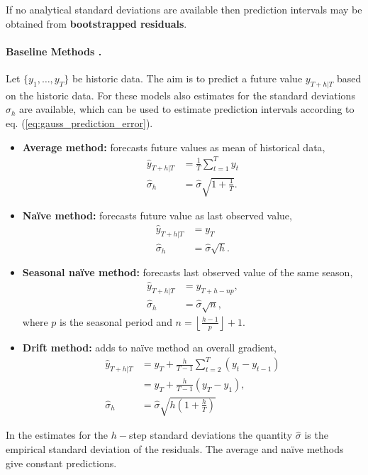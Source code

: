 \documentclass[12pt,a4paper]{article}
\begin{document}
If no analytical standard deviations are available then prediction intervals may be obtained from \textbf{bootstrapped residuals}.


\paragraph{Baseline Methods \cite{hyndman_forecasting_principles_2018}.}
Let $\{y_1, \dots, y_T\}$ be historic data. The aim is to predict a future value $y_{T+h | T}$ based on the historic data. For these models also estimates for the standard deviations $\hat\sigma_h$ are available, which can be used to estimate prediction intervals according to eq. (\ref{eq:gauss_prediction_error}).
\begin{itemize}
	\item \textbf{Average method:} forecasts future values as mean of historical data, 
	\begin{align}
	\hat y_{T+h | T} &= \frac{1}{T}\sum_{t=1} ^T y_t \\ 
	\hat \sigma_h &= \hat \sigma \sqrt{1+\frac{1}{T}}. 
	\end{align}
	\item \textbf{Na\"ive method:} forecasts future value as last observed value, 
	\begin{align}
	\hat y_{T+h | T} &= y_T \\
	\hat \sigma_h &= \hat \sigma \sqrt{h}. 
	\end{align}
	\item \textbf{Seasonal na\"ive method:} forecasts last observed value of the same season, 
	\begin{align}
	\hat y_{T+h | T} &=y_{T+h-np}, \\
	\hat \sigma_h &= \hat \sigma \sqrt{n}, 
	\end{align}
	where $p$ is the seasonal period and  $n = \left \lfloor{\frac{h-1}{p}}\right \rfloor + 1$. 
	\item \textbf{Drift method:} adds to na\"ive method an overall gradient,   
	\begin{align}
	\hat y_{T+h | T} &= y_{T} +  \frac{h}{T-1} \sum_{t=2}^{T} \left(y_t - y_{t-1}\right) \\ &= y_{T} +  \frac{h}{T-1}  \left(y_T - y_1\right), \\
	\hat \sigma_h &= \hat \sigma \sqrt{h\left(1 + \frac{h}{T}\right)}
	\end{align}
\end{itemize}
In the estimates for the $h-$step standard deviations the quantity $\hat \sigma$ is the empirical standard deviation of the residuals.  The average and na\"ive methods give constant predictions. 
\end{document}
